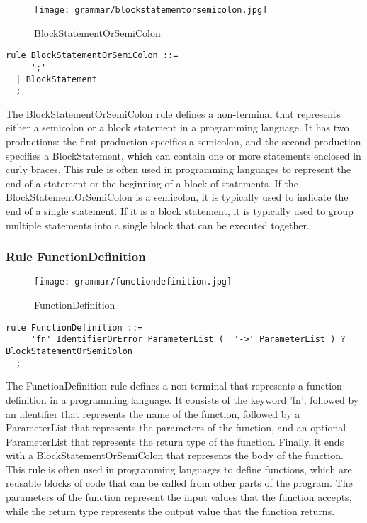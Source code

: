 \begin{figure}[!ht]
\centering
\texttt{[image: grammar/blockstatementorsemicolon.jpg]}
\caption{BlockStatementOrSemiColon}
\end{figure}

\begin{lstlisting}
rule BlockStatementOrSemiColon ::=
     ';' 
  | BlockStatement 
  ;
\end{lstlisting}

The BlockStatementOrSemiColon rule defines a non-terminal that represents either a semicolon or a block statement in a programming language. It has two productions: the first production specifies a semicolon, and the second production specifies a BlockStatement, which can contain one or more statements enclosed in curly braces. This rule is often used in programming languages to represent the end of a statement or the beginning of a block of statements. If the BlockStatementOrSemiColon is a semicolon, it is typically used to indicate the end of a single statement. If it is a block statement, it is typically used to group multiple statements into a single block that can be executed together.

\subsubsection*{Rule FunctionDefinition}

\begin{figure}[!ht]
\centering
\texttt{[image: grammar/functiondefinition.jpg]}
\caption{FunctionDefinition}
\end{figure}


\begin{lstlisting}
rule FunctionDefinition ::=
     'fn' IdentifierOrError ParameterList (  '->' ParameterList ) ?  BlockStatementOrSemiColon 
  ;
\end{lstlisting}

The FunctionDefinition rule defines a non-terminal that represents a function definition in a programming language. It consists of the keyword 'fn', followed by an identifier that represents the name of the function, followed by a ParameterList that represents the parameters of the function, and an optional ParameterList that represents the return type of the function. Finally, it ends with a BlockStatementOrSemiColon that represents the body of the function. This rule is often used in programming languages to define functions, which are reusable blocks of code that can be called from other parts of the program. The parameters of the function represent the input values that the function accepts, while the return type represents the output value that the function returns.

